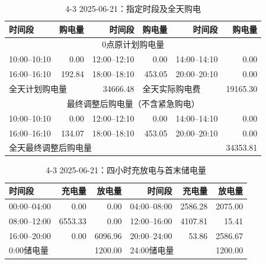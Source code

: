 \FloatBarrier
\begin{table}[htbp]\centering\scriptsize
\caption{4-3 2025-06-21：指定时段及全天购电}
\begin{tabular}{lrrrrr}\toprule
时间段 & 购电量 & 时间段 & 购电量 & 时间段 & 购电量\\\midrule
\multicolumn{6}{c}{0点原计划购电量}\\
10:00--10:10 & 0.00 & 12:00--12:10 & 0.00 & 14:00--14:10 & 0.00\\
16:00--16:10 & 192.84 & 18:00--18:10 & 453.05 & 20:00--20:10 & 0.00\\
\multicolumn{2}{l}{全天计划购电量} & 34666.48 & \multicolumn{2}{l}{全天实际购电费} & 19165.30\\
\multicolumn{6}{c}{最终调整后购电量（不含紧急购电）}\\
10:00--10:10 & 0.00 & 12:00--12:10 & 0.00 & 14:00--14:10 & 0.00\\
16:00--16:10 & 134.07 & 18:00--18:10 & 453.05 & 20:00--20:10 & 0.00\\
\multicolumn{5}{l}{全天最终调整后购电量} & 34353.81\\
\bottomrule\end{tabular}\end{table}

\begin{table}[htbp]\centering\scriptsize
\caption{4-3 2025-06-21：四小时充放电与首末储电量}
\begin{tabular}{lrrrrr}\toprule
时间段 & 充电量 & 放电量 & 时间段 & 充电量 & 放电量\\\midrule
00:00--04:00 & 0.00 & 0.00 & 04:00--08:00 & 2586.28 & 2075.00\\
08:00--12:00 & 6553.33 & 0.00 & 12:00--16:00 & 4107.81 & 15.41\\
16:00--20:00 & 0.00 & 6096.96 & 20:00--24:00 & 53.86 & 2586.67\\
\multicolumn{2}{l}{0:00储电量} & 1200.00 & \multicolumn{2}{l}{24:00储电量} & 1200.00\\
\bottomrule\end{tabular}\end{table}

